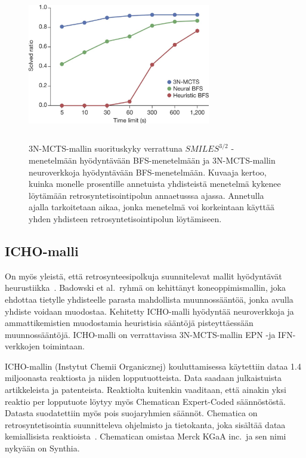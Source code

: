 \documentclass[finnish,twoside,censored,tkt,sw-line]{HYthesisML}
\begin{document}
\begin{figure}[!ht]
    \centering
    \includegraphics[width=8cm, height=6cm]{3N-MCTS-performance-fig.jpg}
    \caption{
        3N-MCTS-mallin suorituskyky verrattuna \(SMILES^{3/2}\) -menetelmään hyödyntävään BFS-menetelmään ja 3N-MCTS-mallin neuroverkkoja hyödyntävään BFS-menetelmään.
        Kuvaaja kertoo, kuinka monelle prosentille annetuista yhdisteistä menetelmä kykenee löytämään retrosyntetisointipolun annaetusssa ajassa.
        Annetulla ajalla tarkoitetaan aikaa, jonka menetelmä voi korkeintaan käyttää yhden yhdisteen retrosyntetisointipolun löytämiseen.
    }
    {\cite{SeglerMarwinHS2018Pcsw}}
    {\label{fig:3n-mcts-performance}}
\end{figure}

\subsection{ICHO-malli}

On myös yleistä, että retrosynteesipolkuja suunnitelevat mallit hyödyntävät heurustiikka~\cite{ExpertKnowledgeRetorsynthesis}.
Badowski et al.\ ryhmä on kehittänyt koneoppimismallin, joka ehdottaa tietylle yhdisteelle parasta mahdollista muunnossääntöä, jonka avulla yhdiste voidaan muodostaa.
Kehitetty ICHO-malli hyödyntää  neuroverkkoja ja ammattikemistien muodostamia heuristisia sääntöjä pisteyttäessään muunnossääntöjä.
ICHO-malli on verrattavissa 3N-MCTS-mallin EPN -ja IFN-verkkojen toimintaan.

ICHO-mallin (Instytut Chemii Organicznej) kouluttamisessa käytettiin dataa 1.4 miljoonasta reaktiosta ja niiden lopputuotteista.
Data saadaan julkaistuista artikkeleista ja patenteista.
Reaktiolta kuitenkin vaaditaan, että ainakin yksi reaktio per lopputuote löytyy myös Chematican Expert-Coded säännöstöstä.
Datasta suodatettiin myös pois suojaryhmien säännöt.
Chematica on retrosyntetisointia suunnitteleva ohjelmisto ja tietokanta, joka sisältää dataa kemiallisista reaktioista~\cite{synthia}.
Chematican omistaa Merck KGaA inc.\ ja sen nimi nykyään on Synthia.
\end{document}

